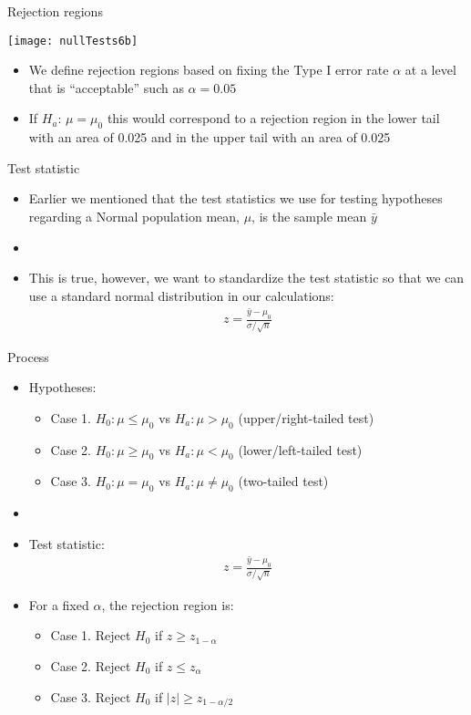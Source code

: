 \documentclass[xcolor=dvipsnames]{beamer}
\begin{document}
\begin{frame}{Rejection regions}
	\begin{center}
		\texttt{[image: nullTests6b]}
	\end{center}
	\begin{itemize}
		\item We define rejection regions based on fixing the Type I error rate $\alpha$ at a level that is ``acceptable'' such as $\alpha = 0.05$ 
		\item If $H_a$: $\mu = \mu_0$ this would correspond to a rejection region in the lower tail with an area of 0.025 and in the upper tail with an area of 0.025
	\end{itemize}
\end{frame}

\begin{frame}{Test statistic}
	\begin{itemize}
		\item Earlier we mentioned that the test statistics we use for testing hypotheses regarding a Normal population mean, $\mu$, is the sample mean $\bar{y}$
		\item[]
		\item This is true, however, we want to standardize the test statistic so that we can use a standard normal distribution in our calculations:
		\begin{gather*}
			z = \frac{\bar{y} - \mu_0}{\sigma / \sqrt{n}}
		\end{gather*}
	\end{itemize}
\end{frame}

\begin{frame}{Process}
	\begin{itemize}
		\item Hypotheses:
		\begin{itemize}
			\item Case 1. $H_0: \mu \leq \mu_0$ vs $H_a: \mu > \mu_0$ (upper/right-tailed test)
			\item Case 2. $H_0: \mu \geq \mu_0$ vs $H_a: \mu < \mu_0$ (lower/left-tailed test)
			\item Case 3. $H_0: \mu = \mu_0$ vs $H_a: \mu \neq \mu_0$ (two-tailed test)
		\end{itemize}
		\item[]
		\item Test statistic:
		\begin{gather*}
					z = \frac{\bar{y} - \mu_0}{\sigma / \sqrt{n}}
		\end{gather*}
		
		\item For a fixed $\alpha$, the rejection region is:
		\begin{itemize}
			\item Case 1. Reject $H_0$ if $z \geq z_{1-\alpha}$ 
			\item Case 2. Reject $H_0$ if $z \leq z_{\alpha}$ 
			\item Case 3. Reject $H_0$ if $|z| \geq z_{1-\alpha/2}$ 
		\end{itemize}
		
	\end{itemize}
\end{frame}
\end{document}
